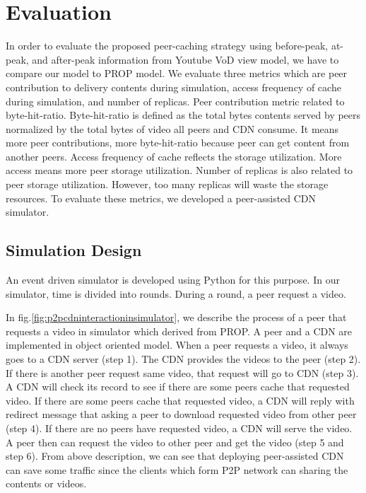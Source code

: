 \documentclass[10pt,final,journal,a4paper]{IEEEtran}
\begin{document}
\section{Evaluation}\label{evaluation}

In order to evaluate the proposed peer-caching strategy using before-peak, at-peak, and after-peak information from Youtube VoD view model, we have to compare our model to PROP model.
We evaluate three metrics which are peer contribution to delivery contents during simulation,  access frequency of cache during simulation, and number of replicas. 
Peer contribution metric related to byte-hit-ratio. 
Byte-hit-ratio is defined as the total bytes contents served by peers normalized by the total bytes of video all peers and CDN consume.
It means more peer contributions, more byte-hit-ratio because peer can get content from another peers. 
Access frequency of cache reflects the storage utilization. 
More access means more peer storage utilization.  
Number of replicas is also related to peer storage utilization.  
However, too many replicas will waste the storage resources.
To evaluate these metrics, we developed a peer-assisted CDN simulator. 


\subsection{Simulation Design}\label{simulationdesign}
An event driven simulator is developed using Python for this purpose.
In our simulator, time is divided into rounds. 
During a round, a peer request a video.

In fig.\ref{fig:p2pcdninteractioninsimulator}, we describe the process of a peer that requests a video in simulator which derived from PROP.
A peer and a CDN are implemented in object oriented model. 
When a peer requests a video, it always goes to a CDN server (step 1). 
The CDN provides the videos to the peer (step 2). 
If there is another peer request same video, that request will go to CDN (step 3).  
A CDN will check its record to see if there are some peers cache that requested video.  
If there are some peers cache that requested video, a CDN will reply with redirect message that asking a peer to download requested video from other peer (step 4).
If there are no peers have requested video, a CDN will serve the video.   
A peer then can request the video to other peer and get the video (step 5 and step 6).
From above description, we can see that deploying peer-assisted CDN can save some traffic since the clients which form P2P network can sharing the contents or videos.
\end{document}
